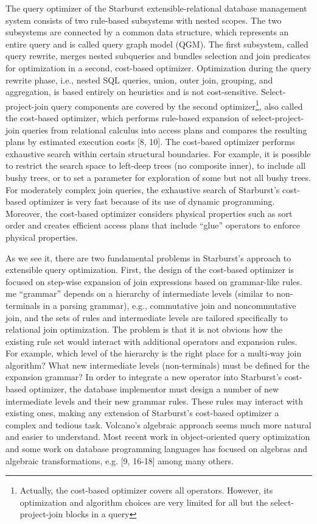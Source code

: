 \documentclass[a4paper,12pt,notitlepage,twoside,openright]{article}
\begin{document}
The query optimizer of the Starburst extensible-relational database
management system consists of two rule-based subsystems with nested
scopes. The two subsystems are connected by a common data structure,
which represents an entire query and is called query graph model (QGM).
The first subsystem, called query rewrite, merges nested subqueries and
bundles selection and join predicates for optimization in a second,
cost-based optimizer. Optimization during the query rewrite phase, i.e.,
nested SQL queries, union, outer join, grouping, and aggregation, is
based entirely on heuristics and is not cost-sensitive.
Select-project-join query components are covered by the second
optimizer\footnote{Actually, the cost-based optimizer covers all
  operators. However, its optimization and algorithm choices are very
  limited for all but the select-project-join blocks in a query}, also
called the cost-based optimizer, which performs rule-based expansion of
select-project-join queries from relational calculus into access plans
and compares the resulting plans by estimated execution costs {[}8,
10{]}. The cost-based optimizer performs exhaustive search within
certain structural boundaries. For example, it is possible to restrict
the search space to left-deep trees (no composite inner), to include all
bushy trees, or to set a parameter for exploration of some but not all
bushy trees. For moderately complex join queries, the exhaustive search
of Starburst's cost-based optimizer is very fast because of its use of
dynamic programming. Moreover, the cost-based optimizer considers
physical properties such as sort order and creates efficient access
plans that include ``glue'' operators to enforce physical properties.

As we see it, there are two fundamental problems in Starburst's approach
to extensible query optimization. First, the design of the cost-based
optimizer is focused on step-wise expansion of join expressions based on
grammar-like rules. me ``grammar'' depends on a hierarchy of intermediate
levels (similar to non-terminals in a parsing grammar), e.g.,
commutative join and noncommutative join, and the sets of rules and
intermediate levels are tailored specifically to relational join
optimization. The problem is that it is not obvious how the existing
rule set would interact with additional operators and expansion rules.
For example, which level of the hierarchy is the right place for a
multi-way join algorithm? What new intermediate levels (non-terminals)
must be defined for the expansion grammar? In order to integrate a new
operator into Starburst's cost-based optimizer, the database implementor
must design a number of new intermediate levels and their new grammar
rules. These rules may interact with existing ones, making any extension
of Starburst's cost-based optimizer a complex and tedious task.
Volcano's algebraic approach seems much more natural and easier to
understand. Most recent work in object-oriented query optimization and
some work on database programming languages has focused on algebras and
algebraic transformations, e.g. {[}9, 16-18{]} among many others.
\end{document}
